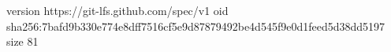 version https://git-lfs.github.com/spec/v1
oid sha256:7bafd9b330e774e8dff7516cf5e9d87879492be4d545f9e0d1feed5d38dd5197
size 81
